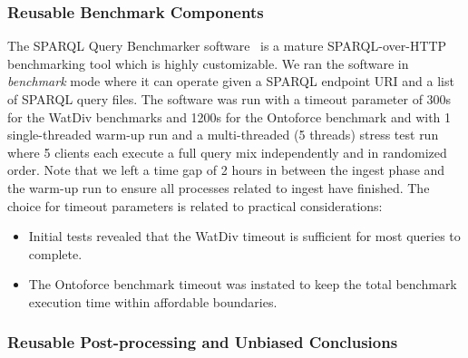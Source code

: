 \begin{table}[htbp!]
	\centering
	\caption{Different configuration choices defined in this benchmark}
	\label{table:configs}
\end{table}

\subsubsection{Reusable Benchmark Components}
The SPARQL Query Benchmarker software~\cite{sparqlquerybm} is a mature SPARQL-over-HTTP benchmarking tool which is highly customizable. We ran the software in \emph{benchmark} mode where it can operate given a SPARQL endpoint URI and a list of SPARQL query files. The software was run with a timeout parameter of 300s for the WatDiv benchmarks and 1200s for the Ontoforce benchmark and with 1 single-threaded warm-up run and a multi-threaded (5 threads) stress test run where 5 clients each execute a full query mix independently and in randomized order. Note that we left a time gap of 2 hours in between the ingest phase and the warm-up run to ensure all processes related to ingest have finished.
The choice for timeout parameters is related to practical considerations: 
\begin{itemize}
	\item Initial tests revealed that the WatDiv timeout is sufficient for most queries to complete.
	\item The Ontoforce benchmark timeout was instated to keep the total benchmark execution time within affordable boundaries.
\end{itemize} 

\subsubsection{Reusable Post-processing and Unbiased Conclusions}


